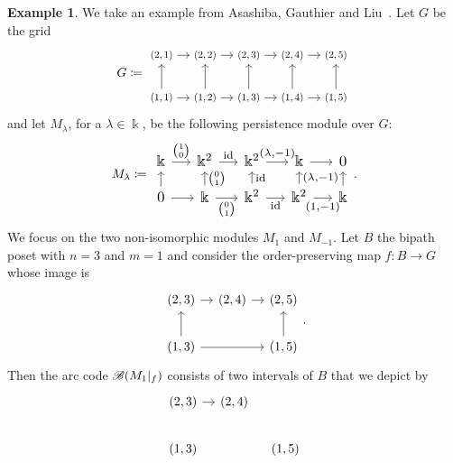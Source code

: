 \documentclass[a4paper,english,reqno]{amsart}
\renewcommand\k{\Bbbk}
\newcommand{\Id}{\mathrm{id}}
\theoremstyle{plain}
\theoremstyle{definition} %
\newtheorem{example}[theorem]{Example}
\begin{document}
\begin{example}\label{exm:fibered arccode_vs_fibered barcode}
We take an example from Asashiba, Gauthier and Liu~\cite[Example 6.2]{asashiba2024interval}.
Let $G$ be the grid
\[
G\coloneqq\begin{tikzcd}[ampersand replacement=\&, column sep=1em, row sep=2em, nodes={scale=0.8}]
	{(2,1)} \& {(2,2)} \& {(2,3)} \& {(2,4)} \& {(2,5)} \\
	{(1,1)} \& {(1,2)} \& {(1,3)} \& {(1,4)} \& {(1,5)}
	\arrow[from=1-1, to=1-2]
	\arrow[from=1-2, to=1-3]
	\arrow[from=1-3, to=1-4]
	\arrow[from=1-4, to=1-5]
	\arrow[from=2-1, to=1-1]
	\arrow[from=2-1, to=2-2]
	\arrow[from=2-2, to=1-2]
	\arrow[from=2-2, to=2-3]
	\arrow[from=2-3, to=1-3]
	\arrow[from=2-3, to=2-4]
	\arrow[from=2-4, to=1-4]
	\arrow[from=2-4, to=2-5]
	\arrow[from=2-5, to=1-5]
\end{tikzcd}\]
and let $M_\lambda$, for a $\lambda\in\k$, be the following persistence module over  $G$:
\[
M_\lambda \coloneqq
\begin{tikzcd}[column sep=1.5em, row sep=1em, nodes={scale=1.2}]
\k & {\k^2} & {\k^2} & \k & 0 \\
0 & \k & {\k^2} & {\k^2} & \k
\arrow["{\binom{1}{0}}", from=1-1, to=1-2]
\arrow["\Id", from=1-2, to=1-3]
\arrow["{(\lambda,-1)}", from=1-3, to=1-4]
\arrow[from=1-4, to=1-5]
\arrow[from=2-1, to=1-1]
\arrow[from=2-1, to=2-2]
\arrow["{\binom{0}{1}}"', from=2-2, to=1-2]
\arrow["{\binom{0}{1}}"', from=2-2, to=2-3]
\arrow["\Id"', from=2-3, to=2-4]
\arrow["{(1,-1)}"', from=2-4, to=2-5]
\arrow["\Id"', from=2-3, to=1-3]
\arrow["{(\lambda,-1)}"', from=2-4, to=1-4]
\arrow[from=2-5, to=1-5]
\end{tikzcd}.
\]
We focus on the two non-isomorphic modules $M_1$ and $M_{-1}$. Let $B$ the
bipath poset with $n=3$ and $m= 1$ and consider the order-preserving map
$f\colon B\to G$ whose image is
\[
  \begin{tikzcd}[ampersand replacement=\&, column sep=1em, row sep=2em]
	{(2,3)} \& {(2,4)} \& {(2,5)} \\
	{(1,3)} \&\& {(1,5)}
	\arrow[from=1-1, to=1-2]
	\arrow[from=1-2, to=1-3]
	\arrow[from=2-1, to=1-1]
	\arrow[from=2-1, to=2-3]
	\arrow[from=2-3, to=1-3]
\end{tikzcd}.\]
Then the arc code $\mathcal{B}(M_1|_f)$ consists of two intervals of $B$ that we
depict by
\[
\begin{tikzcd}[ampersand replacement=\&, column sep=1em, row sep=2em]
	{(2,3)} \& {(2,4)} \\
	{(1,3)} \&\& {(1,5)}
	\arrow[from=1-1, to=1-2]

\end{tikzcd}\]
\end{example}
\end{document}

